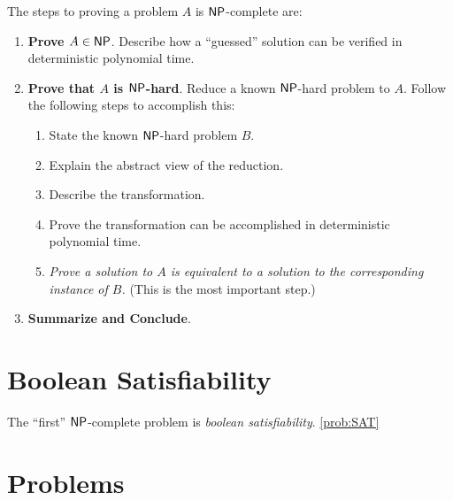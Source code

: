 The steps to proving a problem $A$ is $\textsf{NP}$-complete are:
\begin{enumerate}
	\item \textbf{Prove $A \in \textsf{NP}$}. Describe how a ``guessed'' solution can be verified in deterministic polynomial time.
	\item \textbf{Prove that $A$ is $\textsf{NP}$-hard}. Reduce a known $\textsf{NP}$-hard problem to $A$. Follow the following steps to accomplish this:
	\begin{enumerate}
		\item State the known $\textsf{NP}$-hard problem $B$.
		\item Explain the abstract view of the reduction.
		\item Describe the transformation.
		\item Prove the transformation can be accomplished in deterministic polynomial time.
		\item \emph{Prove a solution to $A$ is equivalent to a solution to the corresponding instance of $B$.} (This is the most important step.)
	\end{enumerate}
	\item \textbf{Summarize and Conclude}.
\end{enumerate}

\section{Boolean Satisfiability}

The ``first'' $\textsf{NP}$-complete problem is \emph{boolean satisfiability}.
\cref{prob:SAT}
\section{Problems}
